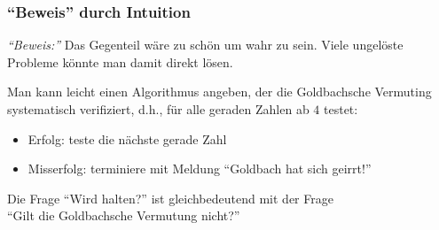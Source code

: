 \documentclass[onlymath]{beamer}
\begin{document}
\begin{frame}[t]\frametitle{"`Beweis"' durch Intuition}

\pause

\emph{"`Beweis:"'} Das Gegenteil wäre zu schön um wahr zu sein. Viele ungelöste Probleme
könnte man damit direkt lösen.\bigskip\pause

\pause

Man kann leicht einen Algorithmus  angeben, der die Goldbachsche Vermuting systematisch verifiziert, d.h., für alle geraden Zahlen ab $4$ testet:
\begin{itemize}
\item Erfolg: teste die nächste gerade Zahl
\item Misserfolg: terminiere mit Meldung "`Goldbach hat sich geirrt!"'
\end{itemize}

Die Frage "`Wird  halten?"' ist gleichbedeutend mit der Frage\\"`Gilt die Goldbachsche Vermutung nicht?"'

\end{frame}
\end{document}
